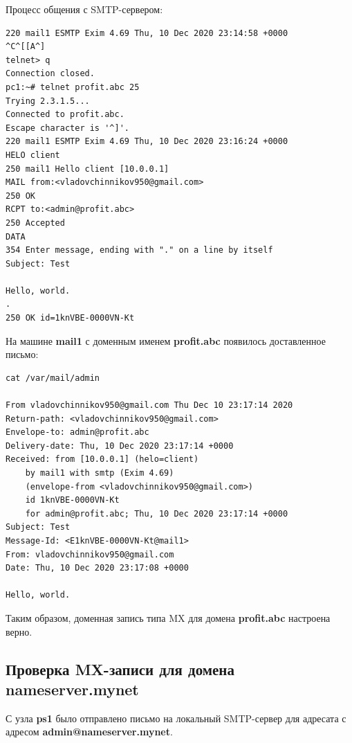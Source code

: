 \documentclass[a4paper,12pt]{article}
\begin{document}
Процесс общения с SMTP-сервером:
\begin{verbatim}
220 mail1 ESMTP Exim 4.69 Thu, 10 Dec 2020 23:14:58 +0000
^C^[[A^]
telnet> q
Connection closed.
pc1:~# telnet profit.abc 25
Trying 2.3.1.5...
Connected to profit.abc.
Escape character is '^]'.
220 mail1 ESMTP Exim 4.69 Thu, 10 Dec 2020 23:16:24 +0000
HELO client
250 mail1 Hello client [10.0.0.1]
MAIL from:<vladovchinnikov950@gmail.com>
250 OK
RCPT to:<admin@profit.abc>
250 Accepted
DATA
354 Enter message, ending with "." on a line by itself
Subject: Test   

Hello, world.
.
250 OK id=1knVBE-0000VN-Kt
\end{verbatim}

На машине \textbf{mail1} с доменным именем \textbf{profit.abc} появилось доставленное письмо:
\begin{verbatim}
cat /var/mail/admin

From vladovchinnikov950@gmail.com Thu Dec 10 23:17:14 2020
Return-path: <vladovchinnikov950@gmail.com>
Envelope-to: admin@profit.abc
Delivery-date: Thu, 10 Dec 2020 23:17:14 +0000
Received: from [10.0.0.1] (helo=client)
	by mail1 with smtp (Exim 4.69)
	(envelope-from <vladovchinnikov950@gmail.com>)
	id 1knVBE-0000VN-Kt
	for admin@profit.abc; Thu, 10 Dec 2020 23:17:14 +0000
Subject: Test
Message-Id: <E1knVBE-0000VN-Kt@mail1>
From: vladovchinnikov950@gmail.com
Date: Thu, 10 Dec 2020 23:17:08 +0000

Hello, world.
\end{verbatim}

Таким образом, доменная запись типа MX для домена \textbf{profit.abc} настроена верно.

\subsection{Проверка MX-записи для домена \textbf{nameserver.mynet}}

С узла \textbf{ps1} было отправлено письмо на локальный SMTP-сервер для адресата с адресом \textbf{admin@nameserver.mynet}.
\end{document}
